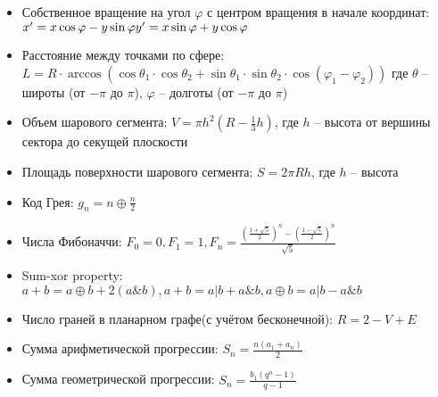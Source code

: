 \begin{itemize}
    \item Собственное вращение на угол $\varphi$ с центром вращения в начале координат: \\ $x' = x \cos \varphi - y \sin \varphi \\ 
    y' = x \sin \varphi + y \cos \varphi$
    \item Расстояние между точками по сфере: 
    $L = R \cdot \arccos(\cos \theta_{1} \cdot \cos \theta_{2} + \sin \theta_{1} \cdot \sin \theta_{2} \cdot \cos(\varphi_{1} - \varphi_{2}))$
    где $\theta$ – широты (от $-\pi$ до $\pi$), $\varphi$ – долготы (от $-\pi$ до $\pi$)
    \item Объем шарового сегмента: $V = \pi h^{2}(R - \frac{1}{3}h)$, где $h$ -- высота от вершины сектора до секущей плоскости
    \item Площадь поверхности шарового сегмента: $S = 2\pi Rh$, где $h$ -- высота
    \item Код Грея: $g_{n} = n \oplus \frac{n}{2}$
    \item Числа Фибоначчи: $F_{0} = 0, F_{1} = 1, F_{n} = \frac{(\frac{1 + \sqrt{5}}{2})^{n} - (\frac{1 - \sqrt{5}}{2})^{n}}{\sqrt{5}}$
    \item Sum-xor property: $a + b = a \oplus b + 2(a\&b), a + b = a|b + a\&b, a \oplus b = a|b - a\&b$
    \item Число граней в планарном графе(с учётом бесконечной): $R = 2 - V + E$
    \item Сумма арифметической прогрессии: $S_{n} = \frac{n(a_{1} + a_{n})}{2}$
    \item Сумма геометрической прогрессии: $S_{n} = \frac{b_{1}(q^{n} - 1)}{q - 1}$
\end{itemize}
